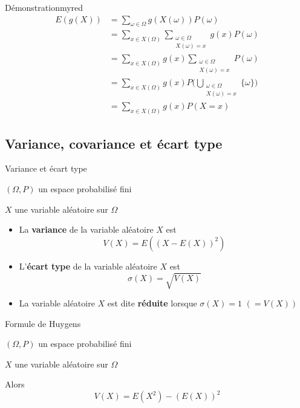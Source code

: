     \begin{demo}{Démonstration}{myred}
        \begin{align*}
            E(g(X)) &= \sum\limits_{\omega \in \Omega} g(X(\omega)) P(\omega) \\
            &= \sum\limits_{x \in X(\Omega)} \sum\limits_{\substack{\omega \in \Omega \\ X(\omega) = x}} g(x) P(\omega) \\
            &= \sum\limits_{x \in X(\Omega)} g(x) \sum\limits_{\substack{\omega \in \Omega \\ X(\omega) = x}} P(\omega) \\
            &= \sum\limits_{x \in X(\Omega)} g(x) P\Big(\bigcup\limits_{\substack{\omega \in \Omega \\ X(\omega) = x}} \{ \omega \} \Big) \\
            &= \sum\limits_{x \in X(\Omega)} g(x) P(X = x)
        \end{align*}
    \end{demo}

\subsection{Variance, covariance et écart type}

    \begin{defi}{Variance et écart type}{}
        \begin{soient}
            \item $(\Omega,P)$ un espace probabilisé fini
            \item $X$ une variable aléatoire sur $\Omega$
        \end{soient}
        \begin{itemize}
            \item La \textbf{variance} de la variable aléatoire $X$ est \[ V(X) = E\left((X-E(X))^2\right) \]
            \item L’\textbf{écart type} de la variable aléatoire $X$ est
            \[ \sigma(X) = \sqrt{V(X)} \]
            \item La variable aléatoire $X$ est dite \textbf{réduite} lorsque $\sigma(X) = 1$ $(=V(X))$
        \end{itemize}
    \end{defi}

    \begin{prop}{Formule de Huygens}{}
        \begin{soient}
            \item $(\Omega,P)$ un espace probabilisé fini
            \item $X$ une variable aléatoire sur $\Omega$
        \end{soient}

        Alors 
        \[ V(X) = E(X^2) - (E(X))^2 \] 
    \end{prop}

